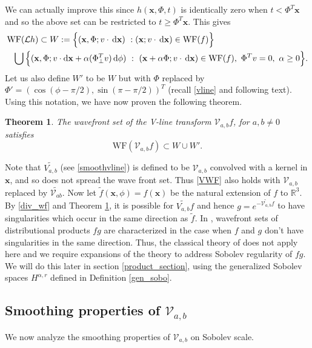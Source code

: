 \documentclass[a4paper,12pt]{amsart}
\numberwithin{equation}{section}
\theoremstyle{plain}
\newtheorem{theorem}{Theorem}
\numberwithin{theorem}{section}
\theoremstyle{definition}
\theoremstyle{remark}
\theoremstyle{remark}
\theoremstyle{remark}
\newcommand{\paren}[1]{\left(#1\right)}               %
\renewcommand{\d}{\,\mathrm{d}}  %
\newcommand{\dd}{\mathrm{d}}  %
\newcommand{\WF}{\mathrm{WF}}                         %
\newcommand{\vx}{{\mathbf{x}}}
\begin{document}
We can actually improve this since $h(\vx,\Phi,t)$ is identically zero when $t<\Phi^T \vx$ and so the above set can be restricted to $t \geq \Phi^T \vx$. This gives
\[\label{div_wf}
\begin{split}
& \WF(\mathcal{L}h) \subset W :=\Big \{(\vx,\Phi; v \cdot \d \vx) \ : (\vx; v \cdot \d \vx ) \in \WF(f) \Big \}
\\ &\hskip.25cm \bigcup \Big \{ (\vx,
\Phi; v \cdot \dd \vx+ \alpha (\Phi_\perp^T v) \d \phi) \ : \  (\vx+ \alpha \Phi; v \cdot \d \vx) \in \WF(f), \ \Phi^T v = 0, \ \alpha \geq 0 \Big \}.
\end{split}
\]
Let us also define $W'$ to be $W$ but with $\Phi$ replaced by $\Phi' = (\cos(\phi-\pi/2),\sin(\pi-\pi/2))^T$ (recall \eqref{vline} and following text). Using this notation, we have now proven the following theorem.
\begin{theorem}\label{v_wf}
The wavefront set of the V-line transform $\mathcal{V}_{a,b}f$, for $a,b\neq 0$ satisfies
\begin{equation}\label{VWF}
\WF\paren{ \mathcal{V}_{a,b}f } \subset W \cup W'.
\end{equation}
\end{theorem}

Note that $\widetilde{V_{a,b}}$ (see \eqref{smoothvline}) is defined to be $\mathcal{V}_{a,b}$ convolved with a kernel in $\vx$, and so does not spread the wave front set. Thus \eqref{VWF} also holds with $\mathcal{V}_{a,b}$ replaced by $\widetilde{\mathcal{V}_{ab}}$. Now let $\tilde{f}(\vx,\phi) = f(\vx)$ be the natural extension of $f$ to $\mathbb{R}^3$. By \eqref{div_wf} and Theorem \ref{v_wf}, it is possible for $\widetilde{V_{a,b}}f$ and hence $g = e^{-\widetilde{\mathcal{V}_{a,b}}f}$ to have singularities which occur in the same direction as $\tilde{f}$. In \cite{hormanderI}, wavefront sets of distributional products $fg$ are characterized in the case when $f$ and $g$ don't have singularities in the same direction. Thus, the classical theory of \cite{hormanderI} does not apply here and we require expansions of the theory to address Sobolev regularity of $fg$. We will do this later in section \ref{product_section}, using the generalized Sobolev spaces $H^{\alpha,r}$ defined in Definition \ref{gen_sobo}.

\subsection{Smoothing properties of $\mathcal{V}_{a,b}$}

We now analyze the smoothing properties of $\mathcal{V}_{a,b}$ on Sobolev scale.
\end{document}
